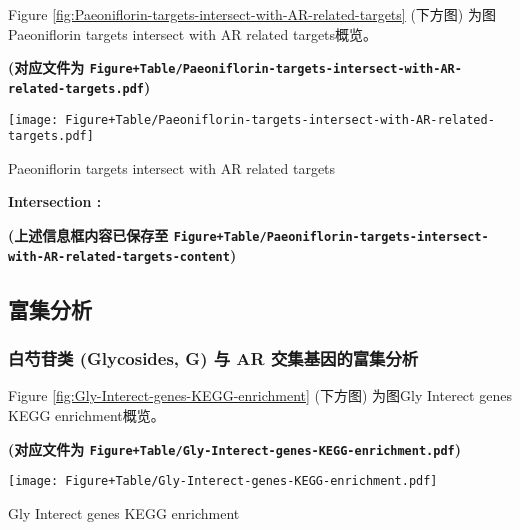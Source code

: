 \documentclass[
]{article}
\begin{document}
Figure \ref{fig:Paeoniflorin-targets-intersect-with-AR-related-targets} (下方图) 为图Paeoniflorin targets intersect with AR related targets概览。

\textbf{(对应文件为 \texttt{Figure+Table/Paeoniflorin-targets-intersect-with-AR-related-targets.pdf})}

\def\@captype{figure}
\begin{center}
\texttt{[image: Figure+Table/Paeoniflorin-targets-intersect-with-AR-related-targets.pdf]}
\caption{Paeoniflorin targets intersect with AR related targets}\label{fig:Paeoniflorin-targets-intersect-with-AR-related-targets}
\end{center}
\begin{center}\begin{tcolorbox}[colback=gray!10, colframe=gray!50, width=0.9\linewidth, arc=1mm, boxrule=0.5pt]
\textbf{
Intersection
:}

\vspace{0.5em}



\vspace{2em}
\end{tcolorbox}
\end{center}

\textbf{(上述信息框内容已保存至 \texttt{Figure+Table/Paeoniflorin-targets-intersect-with-AR-related-targets-content})}

\hypertarget{ux5bccux96c6ux5206ux6790}{%
\subsection{富集分析}\label{ux5bccux96c6ux5206ux6790}}

\hypertarget{ux767dux828dux82f7ux7c7b-glycosides-g-ux4e0e-ar-ux4ea4ux96c6ux57faux56e0ux7684ux5bccux96c6ux5206ux6790}{%
\subsubsection{白芍苷类 (Glycosides, G) 与 AR 交集基因的富集分析}\label{ux767dux828dux82f7ux7c7b-glycosides-g-ux4e0e-ar-ux4ea4ux96c6ux57faux56e0ux7684ux5bccux96c6ux5206ux6790}}

Figure \ref{fig:Gly-Interect-genes-KEGG-enrichment} (下方图) 为图Gly Interect genes KEGG enrichment概览。

\textbf{(对应文件为 \texttt{Figure+Table/Gly-Interect-genes-KEGG-enrichment.pdf})}

\def\@captype{figure}
\begin{center}
\texttt{[image: Figure+Table/Gly-Interect-genes-KEGG-enrichment.pdf]}
\caption{Gly Interect genes KEGG enrichment}\label{fig:Gly-Interect-genes-KEGG-enrichment}
\end{center}
\end{document}
